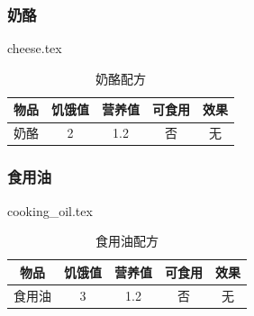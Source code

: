 \subsubsection{奶酪}

{cheese.tex}

\begin{table}[H]
    \centering
    \caption{奶酪配方}
    \setlength{\tabcolsep}{4mm}
    \begin{tabular}{c|cc|cc}
        \toprule
        \textbf{物品} & \textbf{饥饿值} & \textbf{营养值} & \textbf{可食用} & \textbf{效果}\\
        \midrule
        奶酪 & 2 & 1.2 & 否 & 无 \\
        \bottomrule
    \end{tabular}
\end{table}

\subsubsection{食用油}

{cooking_oil.tex}

\begin{table}[H]
    \centering
    \caption{食用油配方}
    \setlength{\tabcolsep}{4mm}
    \begin{tabular}{c|cc|cc}
        \toprule
        \textbf{物品} & \textbf{饥饿值} & \textbf{营养值} & \textbf{可食用} & \textbf{效果}\\
        \midrule
        食用油 & 3 & 1.2 & 否 & 无 \\
        \bottomrule
    \end{tabular}
\end{table}

\newpage